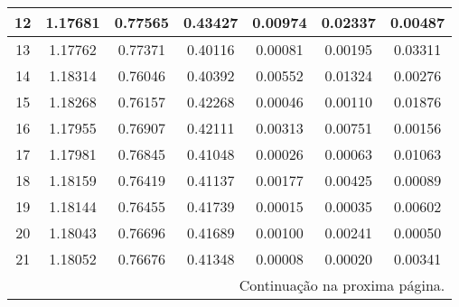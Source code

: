 \documentclass[a4paper,11pt, twoside]{article}
\begin{document}
{\begin{table}[!th]
\begin{center}
\begin{tabular}{ c c c c c c c }
                \midrule
                12 & 1.17681 & 0.77565 & 0.43427 & 0.00974  & 0.02337  & 0.00487 \\
                \midrule
                13 & 1.17762 & 0.77371 & 0.40116 & 0.00081  & 0.00195  & 0.03311 \\
                \midrule
                14 & 1.18314 & 0.76046 & 0.40392 & 0.00552  & 0.01324  & 0.00276 \\
                \midrule
                15 & 1.18268 & 0.76157 & 0.42268 & 0.00046  & 0.00110  & 0.01876 \\
                \midrule
                16 & 1.17955 & 0.76907 & 0.42111 & 0.00313  & 0.00751  & 0.00156 \\
                \midrule
                17 & 1.17981 & 0.76845 & 0.41048 & 0.00026  & 0.00063  & 0.01063 \\
                \midrule
                18 & 1.18159 & 0.76419 & 0.41137 & 0.00177  & 0.00425  & 0.00089 \\
                \midrule
                19 & 1.18144 & 0.76455 & 0.41739 & 0.00015  & 0.00035  & 0.00602 \\
                \midrule
                20 & 1.18043 & 0.76696 & 0.41689 & 0.00100  & 0.00241  & 0.00050 \\
                \midrule
                21 & 1.18052 & 0.76676 & 0.41348 & 0.00008  & 0.00020  & 0.00341 \\
                \midrule
                \multicolumn{7}{r}{{\small Continuação na proxima página.}}\\
                \midrule
            \end{tabular}
        \end{center}
    \end{table}}
    
\end{document}
